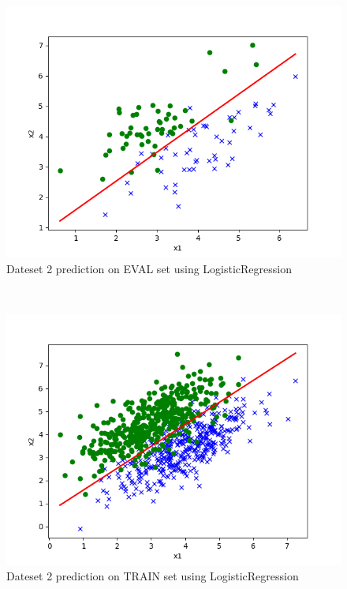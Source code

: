 \begin{answer}
\begin{figure}
  \includegraphics[width=\linewidth]{p01b_pred_2_eval.png}
  \caption{Dateset 2 prediction on EVAL set using LogisticRegression}
  \label{fig:Dateset 2 prediction on EVAL set using LogisticRegression}
\end{figure}\\
\begin{figure}
  \includegraphics[width=\linewidth]{p01b_pred_2_train.png}
  \caption{Dateset 2 prediction on TRAIN set using LogisticRegression}
  \label{fig:Dateset 2 prediction on TRAIN set using LogisticRegression}
\end{figure}\\

\end{answer}
